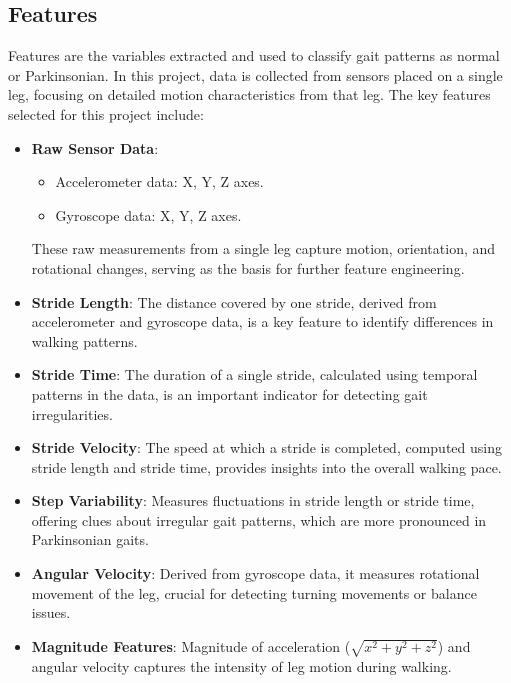 \subsection{Features}

Features are the variables extracted and used to classify gait patterns as normal or Parkinsonian. In this project, data is collected from sensors placed on a single leg, focusing on detailed motion characteristics from that leg. The key features selected for this project include:

\begin{itemize}
	\item \textbf{Raw Sensor Data}:
	\begin{itemize}
		\item Accelerometer data: X, Y, Z axes.
		\item Gyroscope data: X, Y, Z axes.
	\end{itemize}
	These raw measurements from a single leg capture motion, orientation, and rotational changes, serving as the basis for further feature engineering.
	
	\item \textbf{Stride Length}:
	The distance covered by one stride, derived from accelerometer and gyroscope data, is a key feature to identify differences in walking patterns.
	
	\item \textbf{Stride Time}:
	The duration of a single stride, calculated using temporal patterns in the data, is an important indicator for detecting gait irregularities.
	
	\item \textbf{Stride Velocity}:
	The speed at which a stride is completed, computed using stride length and stride time, provides insights into the overall walking pace.
	
	\item \textbf{Step Variability}:
	Measures fluctuations in stride length or stride time, offering clues about irregular gait patterns, which are more pronounced in Parkinsonian gaits.
	
	\item \textbf{Angular Velocity}:
	Derived from gyroscope data, it measures rotational movement of the leg, crucial for detecting turning movements or balance issues.
	
	\item \textbf{Magnitude Features}:
	Magnitude of acceleration (\( \sqrt{x^2 + y^2 + z^2} \)) and angular velocity captures the intensity of leg motion during walking.
	

\end{itemize}

